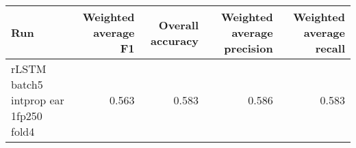 \begin{tabular}{lrrrr}
\toprule
Run & Weighted average F1 & Overall accuracy & Weighted average precision & Weighted average recall \\
\midrule
rLSTM batch5 intprop ear 1fp250 fold4 & 0.563 & 0.583 & 0.586 & 0.583 \\
\bottomrule
\end{tabular}
